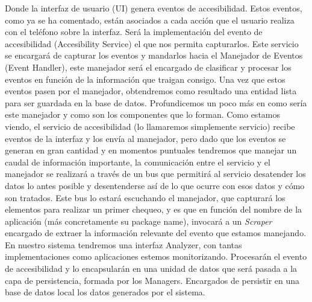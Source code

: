 \documentclass[12pt,a4paper,oneside]{book} %
\begin{document}
Donde la interfaz de usuario (UI) genera eventos de accesibilidad. Estos eventos, como ya se ha comentado, están asociados a cada acción que el usuario realiza con el teléfono sobre la interfaz. Será la implementación del evento de accesibilidad (Accesibility Service) el que nos permita capturarlos. 
\newline
\newline
Este servicio se encargará de capturar los eventos y mandarlos hacia el Manejador de Eventos (Event Handler), este manejador será el encargado de clasificar y procesar los eventos en función de la información que traigan consigo. 
\newline
\newline
Una vez que estos eventos pasen por el manejador, obtendremos como resultado una entidad lista para ser guardada en la base de datos. 
\newline
\newline
Profundicemos un poco más en como sería este manejador y como son los componentes que lo forman. 
\newline
\newline
Como estamos viendo, el servicio de accesibilidad (lo llamaremos simplemente servicio) recibe eventos de la interfaz y los envía al manejador, pero dado que los eventos se generan en gran cantidad y en momentos puntuales tendremos que manejar un caudal de información importante, la comunicación entre el servicio y el manejador se realizará a través de un bus que permitirá al servicio desatender los datos lo antes posible y desentenderse así de lo que ocurre con esos datos y cómo son tratados.
\newline
\newline
Este bus lo estará escuchando el manejador, que capturará los elementos para realizar un primer chequeo, y es que en función del nombre de la aplicación (más concretamente su package name), invocará a un \textit{Scraper} encargado de extraer la información relevante del evento que estamos manejando. 
\newline
\newline
En nuestro sistema tendremos una interfaz Analyzer, con tantas implementaciones como aplicaciones estemos monitorizando. Procesarán el evento de accesibilidad y lo encapsularán en una unidad de datos que será pasada a la capa de persistencia, formada por los Managers. Encargados de persistir en una base de datos local los datos generados por el sistema. 
\newline
\newline
\end{document}
